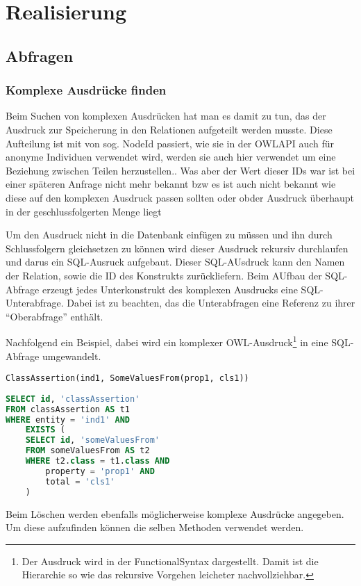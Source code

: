 \chapter{Realisierung}



\section{Abfragen}
\subsection{Komplexe Ausdrücke finden}
Beim Suchen von komplexen Ausdrücken hat man es damit zu tun, das der Ausdruck zur Speicherung in den Relationen aufgeteilt werden musste. Diese Aufteilung ist mit von sog. NodeId passiert, wie sie in der OWLAPI auch für anonyme Individuen verwendet wird, werden sie auch hier verwendet um eine Beziehung zwischen Teilen herzustellen.. Was aber der Wert dieser IDs war ist bei einer späteren Anfrage nicht mehr bekannt bzw es ist auch nicht bekannt wie diese auf den komplexen Ausdruck passen sollten oder obder Ausdruck überhaupt in der geschlussfolgerten Menge liegt

Um den Ausdruck nicht in die Datenbank einfügen zu müssen und ihn durch Schlussfolgern gleichsetzen zu können wird dieser Ausdruck rekursiv durchlaufen und darus ein SQL-Ausruck aufgebaut. Dieser SQL-AUsdruck kann den Namen der Relation, sowie die ID des Konstrukts zurückliefern. Beim AUfbau der SQL-Abfrage erzeugt jedes Unterkonstrukt des komplexen Ausdrucks eine SQL-Unterabfrage. Dabei ist zu beachten, das die Unterabfragen eine Referenz zu ihrer ``Oberabfrage'' enthält.

Nachfolgend ein Beispiel, dabei wird ein komplexer OWL-Ausdruck\footnote{Der Ausdruck wird in der FunctionalSyntax dargestellt. Damit ist die Hierarchie so wie das rekursive Vorgehen leicheter nachvollziehbar.} in eine SQL-Abfrage umgewandelt.

\begin{verbatim}
ClassAssertion(ind1, SomeValuesFrom(prop1, cls1))
\end{verbatim}

\begin{lstlisting}[language=SQL]
SELECT id, 'classAssertion'
FROM classAssertion AS t1
WHERE entity = 'ind1' AND
	EXISTS (
	SELECT id, 'someValuesFrom'
	FROM someValuesFrom AS t2
	WHERE t2.class = t1.class AND
		property = 'prop1' AND
		total = 'cls1'
	)
\end{lstlisting}


Beim Löschen werden ebenfalls möglicherweise komplexe Ausdrücke angegeben. Um diese aufzufinden können die selben Methoden verwendet werden.





